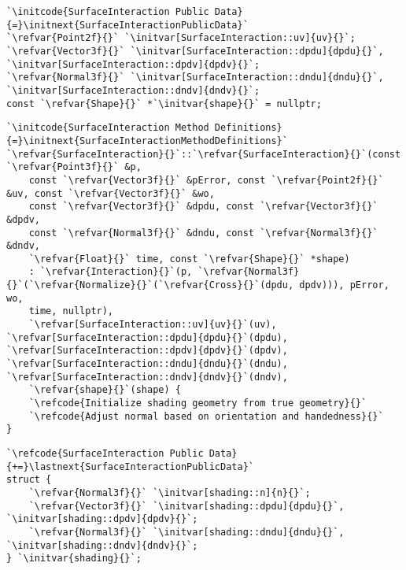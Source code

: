 \begin{lstlisting}
`\initcode{SurfaceInteraction Public Data}{=}\initnext{SurfaceInteractionPublicData}`
`\refvar{Point2f}{}` `\initvar[SurfaceInteraction::uv]{uv}{}`;
`\refvar{Vector3f}{}` `\initvar[SurfaceInteraction::dpdu]{dpdu}{}`, `\initvar[SurfaceInteraction::dpdv]{dpdv}{}`;
`\refvar{Normal3f}{}` `\initvar[SurfaceInteraction::dndu]{dndu}{}`, `\initvar[SurfaceInteraction::dndv]{dndv}{}`;
const `\refvar{Shape}{}` *`\initvar{shape}{}` = nullptr;
\end{lstlisting}

\begin{lstlisting}
`\initcode{SurfaceInteraction Method Definitions}{=}\initnext{SurfaceInteractionMethodDefinitions}`
`\refvar{SurfaceInteraction}{}`::`\refvar{SurfaceInteraction}{}`(const `\refvar{Point3f}{}` &p,
    const `\refvar{Vector3f}{}` &pError, const `\refvar{Point2f}{}` &uv, const `\refvar{Vector3f}{}` &wo,
    const `\refvar{Vector3f}{}` &dpdu, const `\refvar{Vector3f}{}` &dpdv,
    const `\refvar{Normal3f}{}` &dndu, const `\refvar{Normal3f}{}` &dndv,
    `\refvar{Float}{}` time, const `\refvar{Shape}{}` *shape)
    : `\refvar{Interaction}{}`(p, `\refvar{Normal3f}{}`(`\refvar{Normalize}{}`(`\refvar{Cross}{}`(dpdu, dpdv))), pError, wo,
    time, nullptr),
    `\refvar[SurfaceInteraction::uv]{uv}{}`(uv), `\refvar[SurfaceInteraction::dpdu]{dpdu}{}`(dpdu), `\refvar[SurfaceInteraction::dpdv]{dpdv}{}`(dpdv), `\refvar[SurfaceInteraction::dndu]{dndu}{}`(dndu), `\refvar[SurfaceInteraction::dndv]{dndv}{}`(dndv),
    `\refvar{shape}{}`(shape) {
    `\refcode{Initialize shading geometry from true geometry}{}`
    `\refcode{Adjust normal based on orientation and handedness}{}`
}
\end{lstlisting}

\begin{lstlisting}
`\refcode{SurfaceInteraction Public Data}{+=}\lastnext{SurfaceInteractionPublicData}`
struct {
    `\refvar{Normal3f}{}` `\initvar[shading::n]{n}{}`;
    `\refvar{Vector3f}{}` `\initvar[shading::dpdu]{dpdu}{}`, `\initvar[shading::dpdv]{dpdv}{}`;
    `\refvar{Normal3f}{}` `\initvar[shading::dndu]{dndu}{}`, `\initvar[shading::dndv]{dndv}{}`;
} `\initvar{shading}{}`;
\end{lstlisting}